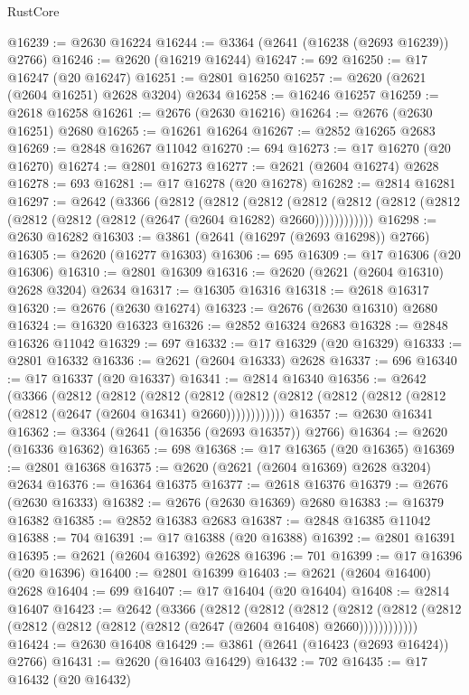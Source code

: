 \begin{lexlean}{RustCore}
\begin{coremodule}
@16239 := @2630 @16224
@16244 := @3364 (@2641 (@16238 (@2693 @16239)) @2766)
@16246 := @2620 (@16219 @16244)
@16247 := 692
@16250 := @17 @16247 (@20 @16247)
@16251 := @2801 @16250
@16257 := @2620 (@2621 (@2604 @16251) @2628 @3204) @2634
@16258 := @16246 @16257
@16259 := @2618 @16258
@16261 := @2676 (@2630 @16216)
@16264 := @2676 (@2630 @16251) @2680
@16265 := @16261 @16264
@16267 := @2852 @16265 @2683
@16269 := @2848 @16267 @11042
@16270 := 694
@16273 := @17 @16270 (@20 @16270)
@16274 := @2801 @16273
@16277 := @2621 (@2604 @16274) @2628
@16278 := 693
@16281 := @17 @16278 (@20 @16278)
@16282 := @2814 @16281
@16297 := @2642
    (@3366
      (@2812
        (@2812
          (@2812
            (@2812 (@2812 (@2812 (@2812 (@2812 (@2812 (@2812 (@2647 (@2604 @16282) @2660))))))))))))
@16298 := @2630 @16282
@16303 := @3861 (@2641 (@16297 (@2693 @16298)) @2766)
@16305 := @2620 (@16277 @16303)
@16306 := 695
@16309 := @17 @16306 (@20 @16306)
@16310 := @2801 @16309
@16316 := @2620 (@2621 (@2604 @16310) @2628 @3204) @2634
@16317 := @16305 @16316
@16318 := @2618 @16317
@16320 := @2676 (@2630 @16274)
@16323 := @2676 (@2630 @16310) @2680
@16324 := @16320 @16323
@16326 := @2852 @16324 @2683
@16328 := @2848 @16326 @11042
@16329 := 697
@16332 := @17 @16329 (@20 @16329)
@16333 := @2801 @16332
@16336 := @2621 (@2604 @16333) @2628
@16337 := 696
@16340 := @17 @16337 (@20 @16337)
@16341 := @2814 @16340
@16356 := @2642
    (@3366
      (@2812
        (@2812
          (@2812
            (@2812 (@2812 (@2812 (@2812 (@2812 (@2812 (@2812 (@2647 (@2604 @16341) @2660))))))))))))
@16357 := @2630 @16341
@16362 := @3364 (@2641 (@16356 (@2693 @16357)) @2766)
@16364 := @2620 (@16336 @16362)
@16365 := 698
@16368 := @17 @16365 (@20 @16365)
@16369 := @2801 @16368
@16375 := @2620 (@2621 (@2604 @16369) @2628 @3204) @2634
@16376 := @16364 @16375
@16377 := @2618 @16376
@16379 := @2676 (@2630 @16333)
@16382 := @2676 (@2630 @16369) @2680
@16383 := @16379 @16382
@16385 := @2852 @16383 @2683
@16387 := @2848 @16385 @11042
@16388 := 704
@16391 := @17 @16388 (@20 @16388)
@16392 := @2801 @16391
@16395 := @2621 (@2604 @16392) @2628
@16396 := 701
@16399 := @17 @16396 (@20 @16396)
@16400 := @2801 @16399
@16403 := @2621 (@2604 @16400) @2628
@16404 := 699
@16407 := @17 @16404 (@20 @16404)
@16408 := @2814 @16407
@16423 := @2642
    (@3366
      (@2812
        (@2812
          (@2812
            (@2812 (@2812 (@2812 (@2812 (@2812 (@2812 (@2812 (@2647 (@2604 @16408) @2660))))))))))))
@16424 := @2630 @16408
@16429 := @3861 (@2641 (@16423 (@2693 @16424)) @2766)
@16431 := @2620 (@16403 @16429)
@16432 := 702
@16435 := @17 @16432 (@20 @16432)

\end{coremodule}
\end{lexlean}
